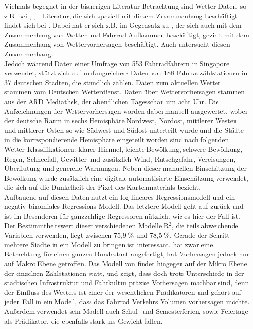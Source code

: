 \documentclass[a4paper,12pt]{thesis}
\begin{document}
Vielmals begegnet in der bisherigen Literatur Betrachtung sind Wetter Daten, so z.B. bei \cite{Holmgren2017}, \cite{Broucke2019}, \cite{Li2015}. Literatur, die sich speziell mit diesem Zusammenhang beschäftigt findet sich bei \cite{Wessel2020}. Dabei hat er sich z.B. im Gegensatz zu \cite{Nankervis1999}, der sich auch mit dem Zusammenhang von Wetter und Fahrrad Aufkommen beschäftigt, gezielt mit dem Zusammenhang von Wettervorhersagen beschäftigt. Auch \cite{Meng2016} untersucht diesen Zusammenhang.\\
Jedoch während \cite{Meng2016} Daten einer Umfrage von 553 Fahrradfahrern in Singapore verwendet, stützt sich \cite{Wessel2020} auf umfangreichere Daten von 188 Fahrradzählstationen in 37 deutschen Städten, die stündlich zählen. Daten zum aktuellen Wetter stammen vom Deutschen Wetterdienst. Daten über Wettervorhersagen stammen aus der ARD Mediathek, der abendlichen Tagesschau um acht Uhr. Die Aufzeichnungen der Wettervorhersagen worden dabei manuell ausgewertet, wobei der deutsche Raum in sechs Hemisphäre Nordwest, Nordost, mittlerer Westen und mittlerer Osten so wie Südwest und Südost unterteilt wurde und die Städte in die korrespondierende Hemisphäre eingeteilt worden sind nach folgenden Wetter Klassifikationen: klarer Himmel, leichte Bewölkung, schwere Bewölkung, Regen, Schneefall, Gewitter und zusätzlich Wind, Rutschgefahr, Vereisungen, Überflutung und generelle Warnungen. Neben dieser manuellen Einschätzung der Bewölkung wurde zusätzlich eine digitale automatisierte Einschätzung verwendet, die sich auf die Dunkelheit der Pixel des Kartenmaterials bezieht.\\
Aufbauend auf diesen Daten nutzt \cite{Wessel2020} ein log-lineares Regressionsmodell und ein negativ binomiales Regressions Modell. Das letztere Modell geht auf \cite{Hausman1984} zurück und ist im Besonderen für ganzzahlige Regressoren nützlich, wie es hier der Fall ist. Der Bestimmtheitswert dieser verschiedenen Modelle R$^2$, die teils abweichende Variablen verwenden, liegt zwischen 75,9 \% und 78,5 \%. Gerade der Schritt mehrere Städte in ein Modell zu bringen ist interessant. \cite{Saha2018} hat zwar eine Betrachtung für einen ganzen Bundestaat angefertigt, hat Vorhersagen jedoch nur auf Makro Ebene getroffen. Das Modell von \cite{Wessel2020} findet hingegen auf der Mikro Ebene der einzelnen Zählstationen statt, und zeigt, dass doch trotz Unterschiede in der städtischen Infrastruktur und Fahrkultur präzise Vorhersagen machbar sind, denn der Einfluss des Wetters ist einer der wesentlichen Prädikatoren und gehört auf jeden Fall in ein Modell, dass das Fahrrad Verkehrs Volumen vorhersagen möchte. Außerdem verwendet sein Modell auch Schul- und Semesterferien, sowie Feiertage als Prädikator, die ebenfalls stark ins Gewicht fallen.
\end{document}
